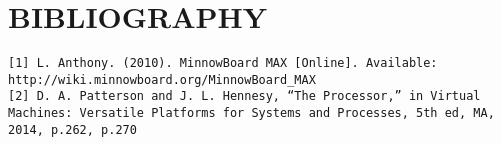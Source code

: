 \documentclass[11pt,draftclsnofoot,onecolumn,letterpaper]{IEEEtran}
\begin{document}
\newpage

\section*{\large {\uppercase {Bibliography}}}
\begin{verbatim}
[1] L. Anthony. (2010). MinnowBoard MAX [Online]. Available: http://wiki.minnowboard.org/MinnowBoard_MAX
[2] D. A. Patterson and J. L. Hennesy, “The Processor,” in Virtual Machines: Versatile Platforms for Systems and Processes, 5th ed, MA, 2014, p.262, p.270
\end{verbatim}
\end{document}
